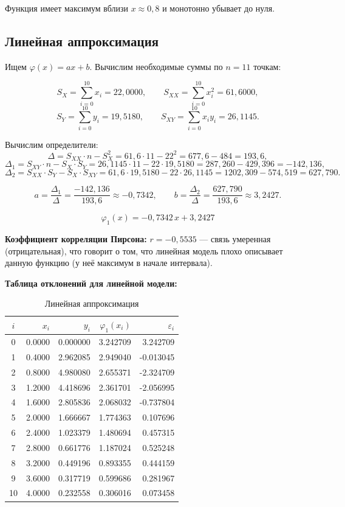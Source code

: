 \documentclass[a4paper,12pt]{article}
\begin{document}
Функция имеет максимум вблизи $x \approx 0{,}8$ и монотонно убывает до нуля.

\subsection{Линейная аппроксимация}

Ищем $\varphi(x) = ax + b$. Вычислим необходимые суммы по $n = 11$ точкам:

\[
S_X = \sum_{i=0}^{10} x_i = 22{,}0000, \qquad
S_{XX} = \sum_{i=0}^{10} x_i^2 = 61{,}6000,
\]
\[
S_Y = \sum_{i=0}^{10} y_i = 19{,}5180, \qquad
S_{XY} = \sum_{i=0}^{10} x_i y_i = 26{,}1145.
\]

Вычислим определители:
\[
\Delta = S_{XX}\cdot n - S_X^2 = 61{,}6 \cdot 11 - 22^2 = 677{,}6 - 484 = 193{,}6,
\]
\[
\Delta_1 = S_{XY}\cdot n - S_X\cdot S_Y = 26{,}1145\cdot 11 - 22\cdot 19{,}5180 = 287{,}260 - 429{,}396 = -142{,}136,
\]
\[
\Delta_2 = S_{XX}\cdot S_Y - S_X\cdot S_{XY} = 61{,}6\cdot 19{,}5180 - 22\cdot 26{,}1145 = 1202{,}309 - 574{,}519 = 627{,}790.
\]

\[
a = \frac{\Delta_1}{\Delta} = \frac{-142{,}136}{193{,}6} \approx -0{,}7342, \qquad
b = \frac{\Delta_2}{\Delta} = \frac{627{,}790}{193{,}6} \approx 3{,}2427.
\]

\[
\boxed{\varphi_1(x) = -0{,}7342\,x + 3{,}2427}
\]

\textbf{Коэффициент корреляции Пирсона:}
$r = -0{,}5535$ --- связь умеренная (отрицательная), что говорит о том, что линейная модель плохо описывает данную функцию (у неё максимум в начале интервала).

\textbf{Таблица отклонений для линейной модели:}
\begin{table}[H]
\centering
\small
\begin{tabular}{|c|r|r|r|r|}
\hline
$i$ & $x_i$ & $y_i$ & $\varphi_1(x_i)$ & $\varepsilon_i$ \\
\hline
0  & 0.0000 & 0.000000  &  3.242709 &  3.242709 \\
1  & 0.4000 & 2.962085  &  2.949040 & -0.013045 \\
2  & 0.8000 & 4.980080  &  2.655371 & -2.324709 \\
3  & 1.2000 & 4.418696  &  2.361701 & -2.056995 \\
4  & 1.6000 & 2.805836  &  2.068032 & -0.737804 \\
5  & 2.0000 & 1.666667  &  1.774363 &  0.107696 \\
6  & 2.4000 & 1.023379  &  1.480694 &  0.457315 \\
7  & 2.8000 & 0.661776  &  1.187024 &  0.525248 \\
8  & 3.2000 & 0.449196  &  0.893355 &  0.444159 \\
9  & 3.6000 & 0.317719  &  0.599686 &  0.281967 \\
10 & 4.0000 & 0.232558  &  0.306016 &  0.073458 \\
\hline
\end{tabular}
\caption{Линейная аппроксимация}
\end{table}
\end{document}

